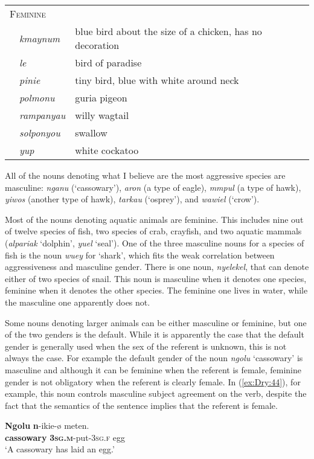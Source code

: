 \documentclass[output=collectionpaper]{langsci/langscibook}
\begin{document}
\begin{tabularx}{0.9\textwidth}{lp{1.8cm}X}
\multicolumn{3}{l}{ \textsc{Feminine}}\\
& \textit{kmaynum} & blue bird about the size of a chicken, has no decoration\\
& \textit{le} & bird of paradise\\
& \textit{pinie} & tiny bird, blue with white around neck\\
& \textit{polmonu} & guria pigeon\\
& \textit{rampanyau} & willy wagtail\\
& \textit{solponyou} & swallow\\
& \textit{yup} & white cockatoo\\
\end{tabularx}
\z

All of the nouns denoting what I believe are the most aggressive species are masculine: \textit{nganu} (`cassowary'), \textit{aron} (a type of eagle), \textit{mmpul} (a type of hawk), \textit{yiwos} (another type of hawk), \textit{tarkau} (`osprey'), and \textit{wawiel} (`crow').

Most of the nouns denoting aquatic animals are feminine. This includes nine out of twelve species of fish, two species of crab, crayfish, and two aquatic mammals (\textit{alpariak} `dolphin', \textit{yuel} `seal'). One of the three masculine nouns for a species of fish is the noun \textit{wuey} for `shark', which fits the weak correlation between aggressiveness and masculine gender. There is one noun, \textit{nyelekel}, that can denote either of two species of snail. This noun is masculine when it denotes one species, feminine when it denotes the other species. The feminine one lives in water, while the masculine one apparently does not.

Some nouns denoting larger animals can be either masculine or feminine, but one of the two genders is the default. While it is apparently the case that the default gender is generally used when the sex of the referent is unknown, this is not always the case. For example the default gender of the noun \textit{ngolu} `cassowary' is masculine and although it can be feminine when the referent is female, feminine gender is not obligatory when the referent is clearly female. In (\ref{ex:Dry:44}), for example, this noun controls masculine subject agreement on the verb, despite the fact that the semantics of the sentence implies that the referent is female.

\ea \label{ex:Dry:44}
\gll \textbf{Ngolu}	\textbf{n}-ikie-ø	meten.\\
\textbf{cassowary} \textbf{\textsc{3sg.m}}-put-\textsc{3sg.f} egg\\
\glt `A cassowary has laid an egg.'
\z
\end{document}
